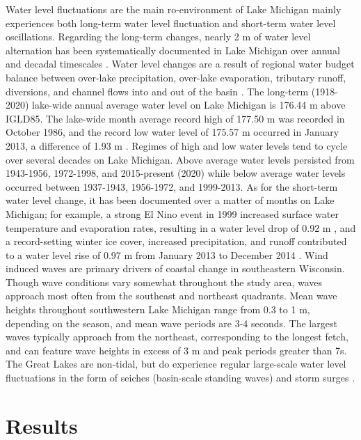 Water level fluctuations are the main ro-environment of Lake Michigan mainly
experiences both long-term water level fluctuation and short-term water level
oscillations. Regarding the long-term changes, nearly 2 m of water level
alternation has been systematically documented in Lake Michigan over annual and
decadal timescales \citep{quinn1990lake,gronewold2014water}. Water level changes
are a result of regional water budget balance between over-lake precipitation,
over-lake evaporation, tributary runoff, diversions, and channel flows into and
out of the basin \citep{gronewold_hydrological_2016}. The long-term (1918-2020)
lake-wide annual average water level on Lake Michigan is 176.44 m above IGLD85.
The lake-wide month average record high of 177.50 m was recorded in October
1986, and the record low water level of 175.57 m occurred in January 2013, a
difference of 1.93 m \citep{gronewold2013dynamic}.  Regimes of high and low
water levels tend to cycle over several decades on Lake Michigan. Above average
water levels persisted from 1943-1956, 1972-1998, and 2015-present (2020) while
below average water levels occurred between 1937-1943, 1956-1972, and 1999-2013.
As for the short-term water level change, it  has been documented over a matter
of months on Lake Michigan; for example, a strong El Nino event in 1999
increased surface water temperature and evaporation rates, resulting in a water
level drop of 0.92 m \citep{assel2004hydroclimatic}, and a record-setting winter
ice cover, increased precipitation, and runoff contributed to a water level rise
of 0.97 m from January 2013 to December 2014
\citep{gronewold_hydrological_2016}.  Wind induced waves are primary drivers of
coastal change in southeastern Wisconsin.  Though wave conditions vary somewhat
throughout the study area, waves approach most often from the southeast and
northeast quadrants. Mean wave heights throughout southwestern Lake Michigan
range from 0.3 to 1 m, depending on the season, and mean wave periods are 3-4
seconds. The largest waves typically approach from the northeast, corresponding
to the longest fetch, and can feature wave heights in excess of 3 m and peak
periods greater than 7s.  The Great Lakes are non-tidal, but do experience
regular large-scale water level fluctuations in the form of seiches (basin-scale
standing waves) and storm surges \citep{rao1976surface,as2004high}.

\section{Results} 
\label{Results}

